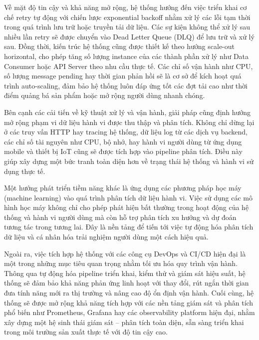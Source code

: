 \documentclass{uetgraduation}
\begin{document}
Về mặt độ tin cậy và khả năng mở rộng, hệ thống hướng đến việc triển khai cơ chế retry tự động với chiến lược exponential backoff nhằm xử lý các lỗi tạm thời trong quá trình lưu trữ hoặc truyền tải dữ liệu. Các sự kiện không thể xử lý sau nhiều lần retry sẽ được chuyển vào Dead Letter Queue (DLQ) để lưu trữ và xử lý sau. Đồng thời, kiến trúc hệ thống cũng được thiết kế theo hướng scale-out horizontal, cho phép tăng số lượng instance của các thành phần xử lý như Data Consumer hoặc API Server theo nhu cầu thực tế. Các chỉ số vận hành như CPU, số lượng message pending hay thời gian phản hồi sẽ là cơ sở để kích hoạt quá trình auto-scaling, đảm bảo hệ thống luôn đáp ứng tốt các đợt tải cao như thời điểm quảng bá sản phẩm hoặc mở rộng người dùng nhanh chóng.

Bên cạnh các cải tiến về kỹ thuật xử lý và vận hành, giải pháp cũng định hướng mở rộng phạm vi dữ liệu hành vi được thu thập và phân tích. Không chỉ dừng lại ở các truy vấn HTTP hay tracing hệ thống, dữ liệu log từ các dịch vụ backend, các chỉ số tài nguyên như CPU, bộ nhớ, hay hành vi người dùng từ ứng dụng mobile và thiết bị IoT cũng sẽ được tích hợp vào pipeline phân tích. Điều này giúp xây dựng một bức tranh toàn diện hơn về trạng thái hệ thống và hành vi sử dụng thực tế.

Một hướng phát triển tiềm năng khác là ứng dụng các phương pháp học máy (machine learning) vào quá trình phân tích dữ liệu hành vi. Việc sử dụng các mô hình học máy không chỉ cho phép phát hiện bất thường trong hoạt động của hệ thống và hành vi người dùng mà còn hỗ trợ phân tích xu hướng và dự đoán tương tác trong tương lai. Đây là nền tảng để tiến tới việc tự động hóa phân tích dữ liệu và cá nhân hóa trải nghiệm người dùng một cách hiệu quả.

Ngoài ra, việc tích hợp hệ thống với các công cụ DevOps và CI/CD hiện đại là một trong những mục tiêu quan trọng nhằm tối ưu hóa quy trình vận hành. Thông qua tự động hóa pipeline triển khai, kiểm thử và giám sát hiệu suất, hệ thống sẽ đảm bảo khả năng phản ứng linh hoạt với thay đổi, rút ngắn thời gian đưa tính năng mới ra thị trường và nâng cao độ ổn định vận hành. Cuối cùng, hệ thống sẽ được mở rộng khả năng tích hợp với các nền tảng giám sát và phân tích phổ biến như Prometheus, Grafana hay các observability platform hiện đại, nhằm xây dựng một hệ sinh thái giám sát – phân tích toàn diện, sẵn sàng triển khai trong môi trường sản xuất thực tế với độ tin cậy cao.
\end{document}
